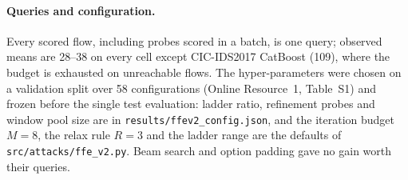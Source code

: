 \paragraph{Queries and configuration.} Every scored flow, including probes scored in a batch, is one query; observed means are 28--38 on every cell except CIC-IDS2017 CatBoost (109), where the budget is exhausted on unreachable flows. The hyper-parameters were chosen on a validation split over 58 configurations (Online Resource~1, Table~S1) and frozen before the single test evaluation: ladder ratio, refinement probes and window pool size are in \texttt{results/ffev2\_config.json}, and the iteration budget $M=8$, the relax rule $R=3$ and the ladder range are the defaults of \texttt{src/attacks/ffe\_v2.py}. Beam search and option padding gave no gain worth their queries.
